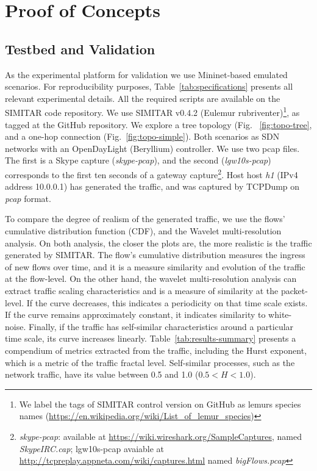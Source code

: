 \chapter{Proof of Concepts}\label{ch:validation}


\section{Testbed and Validation}


As the experimental platform for validation we use Mininet-based emulated scenarios.  For reproducibility purposes, Table~\ref{tab:specifications} presents all relevant experimental details. All the required scripts are available on the SIMITAR code repository\cite{projeto-github}. We use SIMITAR v0.4.2 (Eulemur rubriventer)\footnote{ We label the tags of SIMITAR control version on GitHub as lemurs species names (\href{https://en.wikipedia.org/wiki/List_of_lemur_species}{https://en.wikipedia.org/wiki/List\_of\_lemur\_species})}, as tagged at the GitHub repository. We explore a tree topology (Fig. ~\ref{fig:topo-tree}, and a one-hop connection (Fig.~\ref{fig:topo-simple}). Both scenarios as  SDN networks with an OpenDayLight (Beryllium) controller. We use two pcap files. The first is a Skype capture (\textit{skype-pcap}), and the second (\textit{lgw10s-pcap}) corresponds to the first ten seconds of a gateway capture\footnote{\textit{skype-pcap}: available at \url{https://wiki.wireshark.org/SampleCaptures}, named \textit{SkypeIRC.cap}; lgw10s-pcap avaiable at \url{http://tcpreplay.appneta.com/wiki/captures.html} named \textit{bigFlows.pcap}}. Host host \textit{h1} (IPv4 address 10.0.0.1) has generated the traffic, and was captured by TCPDump on \textit{pcap} format. 

To compare the degree of realism of the generated traffic, we use the flows' cumulative distribution function (CDF)\cite{harpoon-validation}, and the Wavelet multi-resolution analysis\cite{swing-paper}. On both analysis, the closer the plots are, the more realistic is the traffic generated by SIMITAR. The flow’s cumulative distribution measures the ingress of new flows over time, and it is a measure similarity and evolution of the traffic at the flow-level. On the other hand, the wavelet multi-resolution analysis can extract traffic scaling characteristics and is a measure of similarity at the packet-level. If the curve decreases, this indicates a periodicity on that time scale exists. If the curve remains approximately constant, it indicates similarity to white-noise. Finally, if the traffic has self-similar characteristics around a particular time scale, its curve increases linearly. Table~\ref{tab:results-summary} presents a compendium of metrics extracted from the traffic, including the Hurst exponent, which is a metric of the traffic fractal level. Self-similar  processes, such as the network traffic, have its value between 0.5  and 1.0 ($0.5 < H < 1.0 $)\cite{selfsimilar-ethernet}.


